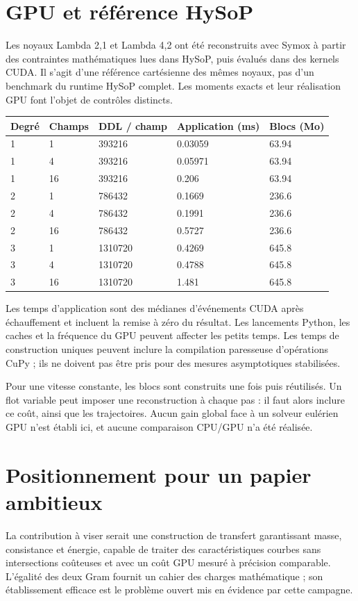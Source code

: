 \documentclass[10pt,a4paper]{article}
\begin{document}
\section{GPU et référence HySoP}
Les noyaux Lambda 2,1 et Lambda 4,2 ont été reconstruits avec Symox à partir des contraintes mathématiques lues dans HySoP, puis évalués dans des kernels CUDA. Il s'agit d'une référence cartésienne des mêmes noyaux, pas d'un benchmark du runtime HySoP complet. Les moments exacts et leur réalisation GPU font l'objet de contrôles distincts.

\begin{center}\small\begin{tabular}{lllll}\toprule
Degré & Champs & DDL / champ & Application (ms) & Blocs (Mo)\\\midrule
1 & 1 & 393216 & 0.03059 & 63.94\\
1 & 4 & 393216 & 0.05971 & 63.94\\
1 & 16 & 393216 & 0.206 & 63.94\\
2 & 1 & 786432 & 0.1669 & 236.6\\
2 & 4 & 786432 & 0.1991 & 236.6\\
2 & 16 & 786432 & 0.5727 & 236.6\\
3 & 1 & 1310720 & 0.4269 & 645.8\\
3 & 4 & 1310720 & 0.4788 & 645.8\\
3 & 16 & 1310720 & 1.481 & 645.8\\
\bottomrule\end{tabular}\end{center}
Les temps d'application sont des médianes d'événements CUDA après échauffement et incluent la remise à zéro du résultat. Les lancements Python, les caches et la fréquence du GPU peuvent affecter les petits temps. Les temps de construction uniques peuvent inclure la compilation paresseuse d'opérations CuPy ; ils ne doivent pas être pris pour des mesures asymptotiques stabilisées.

Pour une vitesse constante, les blocs sont construits une fois puis réutilisés. Un flot variable peut imposer une reconstruction à chaque pas : il faut alors inclure ce coût, ainsi que les trajectoires. Aucun gain global face à un solveur eulérien GPU n'est établi ici, et aucune comparaison CPU/GPU n'a été réalisée.

\section{Positionnement pour un papier ambitieux}
La contribution à viser serait une construction de transfert garantissant masse, consistance et énergie, capable de traiter des caractéristiques courbes sans intersections coûteuses et avec un coût GPU mesuré à précision comparable. L'égalité des deux Gram fournit un cahier des charges mathématique ; son établissement efficace est le problème ouvert mis en évidence par cette campagne.
\end{document}

